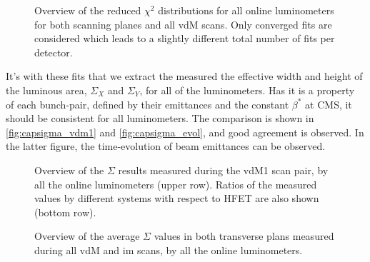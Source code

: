 \begin{figure}[!htb]
	\centering
	\caption{Overview of the reduced $\chi^2$ distributions for all online luminometers for both scanning planes and all vdM scans. Only converged fits are considered which leads to a slightly different total number of fits per detector.}
	\label{fig:chi2_distributions}
\end{figure}

It's with these fits that we extract the measured the effective width and height of the luminous area, $\Sigma_X$ and $\Sigma_Y$, for all of the luminometers. Has it is a property of each bunch-pair, defined by their emittances and the constant $\beta^{*}$ at CMS, it should be consistent for all luminometers. The comparison is shown in \autoref{fig:capsigma_vdm1} and \autoref{fig:capsigma_evol}, and good agreement is observed. In the latter figure, the time-evolution of beam emittances can be observed.

\begin{figure}[!htb]
	\centering
	\caption{Overview of the $\Sigma$ results measured during the vdM1 scan pair, by all the online luminometers (upper row). Ratios of the measured values by different systems with respect to HFET are also shown (bottom row).}
	\label{fig:capsigma_vdm1}
\end{figure}

\begin{figure}[!htb]
	\centering
	\caption{Overview of the average $\Sigma$ values in both transverse plans measured during all vdM and im scans, by all the online luminometers.}
	\label{fig:capsigma_evol}
\end{figure}

\newpage


